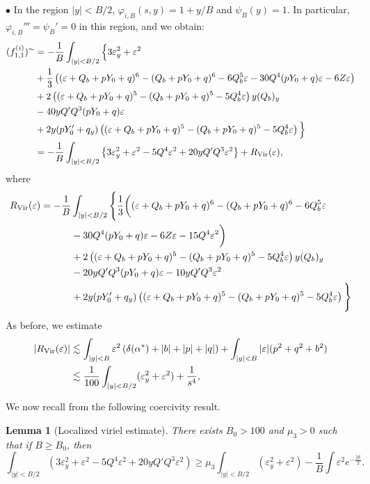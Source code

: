 \documentclass[11pt,a4paper,reqno]{amsart}
\newtheorem{lemma}[theorem]{Lemma}
\theoremstyle{remark}
\numberwithin{equation}{section}
\def\e{\varepsilon}
\def\Yz{Y_0}
\begin{document}
$\bullet$ In the   region $|y|<B/2$, $\varphi_{i,B}(s,y) = 1+ y/B$ and $\psi_B(y)=1$. In particular, $\varphi_{i,B}'''=\psi_B'=0$ in this region, and we obtain:
\begin{align*}
(f^{(i)}_{1,1})^{\sim}  
&    = - \frac {1}{B} \int_{|y|<B/2}  \Big\{ 3 \varepsilon_y^2 + \varepsilon^2  \\
  &   + \frac 13  \left( (\varepsilon + Q_b +p\Yz+q)^6 
-(Q_b+p\Yz+q)^6  - 6 Q_b^5 \varepsilon -30 Q^4(p\Yz+q)\e
 -6 Z\varepsilon \right) 
  \\
  &  + 2\left( (\varepsilon+Q_b+p\Yz+q )^5 -(Q_b+p\Yz+q)^5- 5 Q_b ^4 \varepsilon\right) y (Q_b )_y  
\\
& -40 yQ'Q^3 (p\Yz+q) \e \\
& + 2 y(p \Yz'+q_y)\left((\varepsilon+Q_b+p\Yz+q )^5 -(Q_b+p\Yz+q) ^5- 5 Q_b ^4 \varepsilon\right)\Big\} \\
&    = - \frac {1}   { B} \int_{|y|<B/2}   \left\{ 3 \varepsilon_y^2 + \varepsilon^2 - 5 Q^4 \varepsilon^2 + 20 y Q' Q^3 \varepsilon^2\right\} + R_{\rm Vir}(\varepsilon),
\end{align*}
where
\begin{align*}
R_{\rm Vir}(\varepsilon) = - \frac {1}   { B} & \int_{|y|<B/2} \Bigg\{
\frac 13 \bigg( (\e+Q_b+p\Yz + q)^6 - (Q_b+p\Yz+q)^6 - 6Q_b^5 \e\\ &
-30 Q^4 (p\Yz+q)\e - 6Z\e  - 15 Q^4 \e^2 \bigg)\\
& +2 \left( (\e+Q_b+ p\Yz + q)^5 - (Q_b+p\Yz + q)^5 - 5 Q_b^4 \e\right) y (Q_b)_y
\\ &- 20 y Q' Q^3 (p\Yz+q) \e - 10 y Q' Q^3 \e^2 \\
& +2 y (p\Yz'+q_y) \left( (\e +Q_b+p\Yz+q)^5 - (Q_b+p\Yz +q)^5 - 5Q_b^4 \e\right)\Bigg\} 
\end{align*}
As before, we estimate
\begin{align*}
|R_{\rm Vir}(\varepsilon)|&\lesssim 
\int_{|y|<B} \e^2 \left( \delta(\alpha^*) + |b|+ |p|+|q|\right)
+ \int_{|y|<B} |\e| (p^2+ q^2 + b^2)
\\&\lesssim  \frac 1{100}\int_{|y|<B/2} (\e_y^2+\varepsilon^2) +\frac 1{s^4},
\end{align*}

We now recall from \cite{MMR1} the following coercivity result.

\begin{lemma}[Localized viriel estimate]\label{cl:9}
There exists $B_{0}>100$ and $\mu_{3}>0$ such that
if $B\geq B_{0}$, then
$$
\int_{|y|<B/2}   \left( 3 \varepsilon_y^2 + \varepsilon^2 - 5 Q^4 \varepsilon^2 + 20 y Q' Q^3 \varepsilon^2\right) \geq \mu_{3} \int_{|y|<B/2}  \left(  \varepsilon_y^2 + \varepsilon^2 \right)
-  \frac 1 B \int \e^2 e^{-\frac{|y|}{2}}.
$$
\end{lemma}
 
\end{document}
